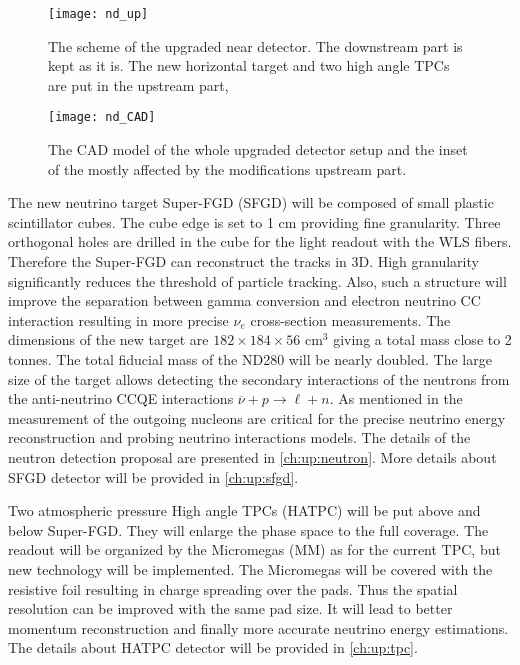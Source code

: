 \documentclass[main.tex]{subfiles}
\begin{document}
\begin{figure}[!ht]
  \centering
  \texttt{[image: nd\_up]}
  \caption{The scheme of the upgraded near detector. The downstream part is kept as it is. The new horizontal target and two high angle TPCs are put in the upstream part,}
  \label{fig:up:nd_up}
\end{figure}

\begin{figure}[!ht]
  \centering
  \texttt{[image: nd\_CAD]}
  \caption{The CAD model of the whole upgraded detector setup and the inset of the mostly affected by the modifications upstream part.}
  \label{fig:up:nd_cad}
\end{figure}

The new neutrino target Super-FGD (SFGD) will be composed of small plastic scintillator cubes. The cube edge is set to 1 cm providing fine granularity. Three orthogonal holes are drilled in the cube for the light readout with the WLS fibers. Therefore the Super-FGD can reconstruct the tracks in 3D. High granularity significantly reduces the threshold of particle tracking. Also, such a structure will improve the separation between gamma conversion and electron neutrino CC interaction resulting in more precise $\nu_e$ cross-section measurements. The dimensions of the new target are $182\times184\times56 \text{ cm}^3$ giving a total mass close to 2 tonnes. The total fiducial mass of the ND280 will be nearly doubled. The large size of the target allows detecting the secondary interactions of the neutrons from the anti-neutrino CCQE interactions $\overline{\nu}+p\to\ell+n$. As mentioned in the  measurement of the outgoing nucleons are critical for the precise neutrino energy reconstruction and probing neutrino interactions models. The details of the neutron detection proposal are presented in \autoref{ch:up:neutron}. More details about SFGD detector will be provided in \autoref{ch:up:sfgd}.

Two atmospheric pressure High angle TPCs (HATPC) will be put above and below Super-FGD. They will enlarge the phase space to the full coverage. The readout will be organized by the Micromegas (MM) as for the current TPC, but new technology will be implemented. The Micromegas will be covered with the resistive foil resulting in charge spreading over the pads. Thus the spatial resolution can be improved with the same pad size. It will lead to better momentum reconstruction and finally more accurate neutrino energy estimations. The details about HATPC detector will be provided in \autoref{ch:up:tpc}.
\end{document}
